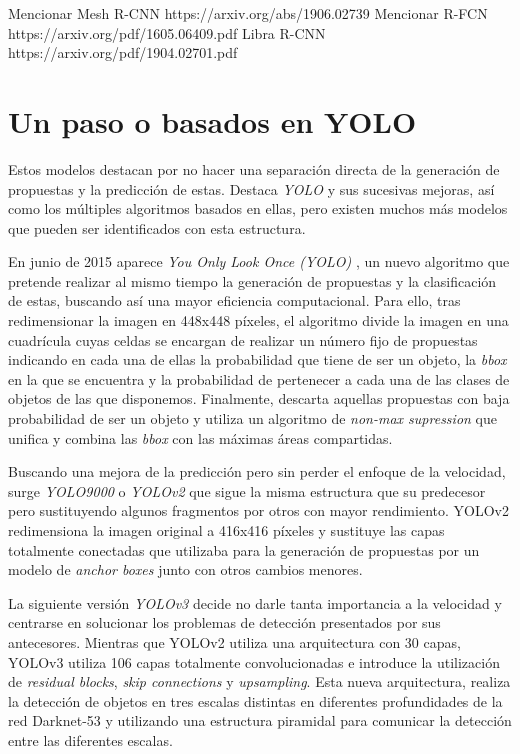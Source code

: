 Mencionar Mesh R-CNN
https://arxiv.org/abs/1906.02739\newline
Mencionar R-FCN
https://arxiv.org/pdf/1605.06409.pdf\newline
Libra R-CNN
https://arxiv.org/pdf/1904.02701.pdf
\section{Un paso o basados en YOLO}
Estos modelos destacan por no hacer una separación directa de la generación de propuestas y la predicción de estas. Destaca \emph{YOLO} y sus sucesivas mejoras, así como los múltiples algoritmos basados en ellas, pero existen muchos más modelos que pueden ser identificados con esta estructura.\newline

En junio de 2015 aparece \emph{You Only Look Once (YOLO)} \cite{2015arXiv150602640R}, un nuevo algoritmo que pretende realizar al mismo tiempo la generación de propuestas y la clasificación de estas, buscando así una mayor eficiencia computacional. Para ello, tras redimensionar la imagen en 448x448 píxeles, el algoritmo divide la imagen en una cuadrícula cuyas celdas se encargan de realizar un número fijo de propuestas indicando en cada una de ellas la probabilidad que tiene de ser un objeto, la \emph{bbox} en la que se encuentra y la probabilidad de pertenecer a cada una de las clases de objetos de las que disponemos. Finalmente, descarta aquellas propuestas con baja probabilidad de ser un objeto y utiliza un algoritmo de \emph{non-max supression} \cite{2017arXiv170404503B} que unifica y combina las \emph{bbox} con las máximas áreas compartidas.\newline

Buscando una mejora de la predicción pero sin perder el enfoque de la velocidad, surge \emph{YOLO9000} o \emph{YOLOv2} \cite{2016arXiv161208242R} que sigue la misma estructura que su predecesor pero sustituyendo algunos fragmentos por otros con mayor rendimiento. YOLOv2 redimensiona la imagen original a 416x416 píxeles y sustituye las capas totalmente conectadas que utilizaba para la generación de propuestas por un modelo de \emph{anchor boxes} \cite{2015arXiv150601497R} junto con otros cambios menores.\newline

La siguiente versión \emph{YOLOv3} \cite{2018arXiv180402767R} decide  no darle tanta importancia a la velocidad y centrarse en solucionar los problemas de detección presentados por sus antecesores. Mientras que YOLOv2 utiliza una arquitectura con 30 capas, YOLOv3 utiliza 106 capas totalmente convolucionadas e introduce la utilización de \emph{residual blocks}, \emph{skip connections} y \emph{upsampling}. Esta nueva arquitectura, realiza la detección de objetos en tres escalas distintas en diferentes profundidades de la red Darknet-53 y utilizando una estructura piramidal \cite{2016arXiv161203144L} para comunicar la detección entre las diferentes escalas.\newline

